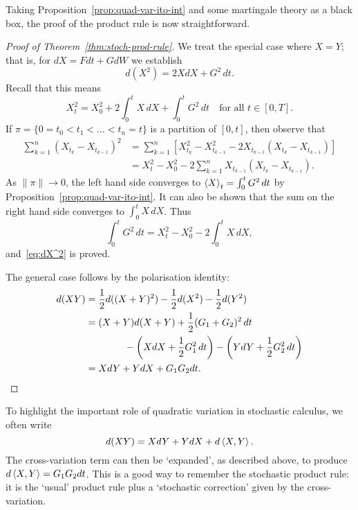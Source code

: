 Taking Proposition~\ref{prop:quad-var-ito-int} and some martingale theory as a black box, the proof of the product rule is now straightforward.
\begin{proof}[Proof of Theorem~\ref{thm:stoch-prod-rule}]
    We treat the special case where $X=Y$; that is, for $dX=Fdt+GdW$ we establish
    \begin{equation*}
        d(X^2) = 2XdX + G^2\,dt.
    \end{equation*}
    Recall that this means
    \begin{equation}
    \label{eq:dX^2}
    X^2_t = X^2_0 + 2\int_0^t X\,dX + \int_0^t G^2\,dt \quad\text{for all }t\in [0,T].
    \end{equation}
    If $\pi=\{0=t_0<t_1<\ldots <t_n=t\}$ is a partition of $[0,t]$, then observe that
    \begin{align*}
        \sum_{k=1}^n (X_{t_k}-X_{t_{k-1}})^2 &= \sum_{k=1}^n [X^2_{t_k}-X^2_{t_{k-1}} - 2X_{t_{k-1}}(X_{t_k}-X_{t_{k-1}})]\\
        &= X^2_t - X^2_0 - 2\sum_{k=1}^n X_{t_{k-1}}(X_{t_k}-X_{t_{k-1}}).
    \end{align*}
    As $\|\pi\|\to 0$, the left hand side converges to $\braket{X}_t = \int_0^t G^2\,dt$ by Proposition~\ref{prop:quad-var-ito-int}. It can also be shown that the sum on the right hand side converges to $\int_0^t X\,dX$. Thus
    \begin{equation*}
        \int_0^t G^2\,dt = X^2_t - X^2_0 - 2\int_0^t X\,dX,
    \end{equation*}
    and~\eqref{eq:dX^2} is proved.

    The general case follows by the polarisation identity:
    \begin{align*}
        d(XY) &= \frac{1}{2}d((X+Y)^2) - \frac{1}{2}d(X^2)-\frac{1}{2}d(Y^2) \\
        &= (X+Y)d(X+Y) + \frac{1}{2}(G_1+G_2)^2\,dt \\
        &\qquad\qquad - \left(XdX + \frac{1}{2}G_1^2\,dt\right) - \left(YdY + \frac{1}{2}G_2^2\,dt\right) \\
        &= XdY + YdX + G_1G_2dt. \qedhere
    \end{align*}
\end{proof}

\begin{remark}
To highlight the important role of quadratic variation in stochastic calculus, we often write
\begin{equation*}
    d(XY) = XdY + YdX + d\braket{X,Y}.
\end{equation*}
The cross-variation term can then be `expanded', as described above, to produce $d\braket{X,Y}=G_1G_2dt$. This is a good way to remember the stochastic product rule: it is the `usual' product rule plus a `stochastic correction' given by the cross-variation.
\end{remark}

